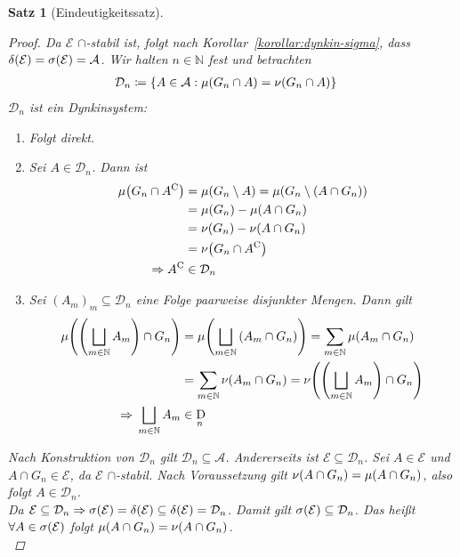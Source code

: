 \documentclass[11pt, twoside, a4paper]{article}
\theoremstyle{plain}
\newtheorem{satz}[blockelement]{Satz}
\numberwithin{equation}{subsection}
\newcommand{\set}[1]{\left\{#1\right\}}
\newcommand{\pair}[1]{\left(#1\right)}
\newcommand{\of}[1]{\mathopen{}\mathclose{}\bgroup\left(#1\aftergroup\egroup\right)}
\newcommand{\impl}[0]{\Rightarrow{}}
\newcommand{\comp}[1]{{#1}^{\mathrm{C}}}
\DeclareMathOperator{\D}{D\!}
\newcommand{\N}{\mathbb{N}}
\newcommand{\mA}{\mathcal{A}}
\newcommand{\mD}{\mathcal{D}}
\newcommand{\mE}{\mathcal{E}}
\begin{document}
\begin{satz}[Eindeutigkeitssatz]
        \begin{proof}
            Da $\mE$ $\cap$-stabil ist, folgt nach Korollar~\ref{korollar:dynkin-sigma}, dass $\delta\of{\mE} = \sigma\of{\mE} = \mA$. Wir halten $n\in\N$ fest und betrachten
            \begin{align*}
                \mD_n &\coloneqq \set{A\in \mA: \mu\of{G_n \cap A} = \nu\of{G_n \cap A}}
            \end{align*}
            $\mD_n$ ist ein Dynkinsystem:
            \begin{enumerate}[label=($\text{D}_{\arabic*}$)]
                \item Folgt direkt.
                \item Sei $A\in\mD_n$. Dann ist
                \begin{align*}
                    \mu\of{G_n \cap \comp{A}} &= \mu\of{G_n \setminus A} = \mu\of{G_n \setminus\pair{A \cap G_n}}\\
                    &= \mu\of{G_n} - \mu\of{A \cap G_n}\\
                    &= \nu\of{G_n} - \nu\of{A \cap G_n}\\
                    &= \nu\of{G_n \cap \comp{A}}\\
                    \impl \comp{A} &\in \mD_n
                \end{align*}
                \item Sei $(A_m)_m \subseteq \mD_n$ eine Folge paarweise disjunkter Mengen. Dann gilt
                \begin{align*}
                    \mu\of{\pair{\bigsqcup_{m\in\N} A_m} \cap G_n} &= \mu\of{\bigsqcup_{m\in\N} \pair{A_m \cap G_n}} = \sum_{m\in\N}^{} \mu\of{A_m \cap G_n}\\
                    &= \sum_{m\in\N}^{} \nu\of{A_m \cap G_n} = \nu\of{\pair{\bigsqcup_{m\in\N} A_m} \cap G_n}\\
                    \impl \bigsqcup_{m\in\N} A_m &\in \D_n
                \end{align*}
            \end{enumerate}
            Nach Konstruktion von $\mD_n$ gilt $\mD_n \subseteq\mA$. Andererseits ist $\mE\subseteq\mD_n$. Sei $A \in\mE$ und $A \cap G_n \in \mE$, da $\mE$ $\cap$-stabil. Nach Voraussetzung gilt $\nu\of{A \cap G_n} = \mu\of{A \cap G_n}$, also folgt $A \in\mD_n$.\\
            Da $\mE \subseteq\mD_n \impl \sigma\of{\mE} = \delta\of{\mE} \subseteq \delta\of{\mE} = \mD_n$. Damit gilt $\sigma\of{\mE} \subseteq  \mD_n$. Das heißt $\forall A\in\sigma\of{\mE}$ folgt $\mu\of{A \cap G_n} = \nu\of{A \cap G_n}$.\\

\end{proof}
\end{satz}
\end{document}
